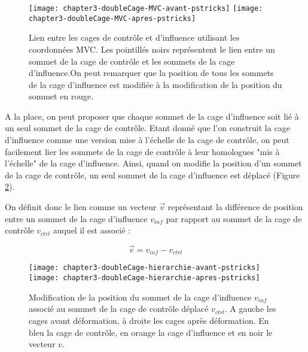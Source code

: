 \begin{figure}[ht]
\begin{center}
  \texttt{[image: chapter3-doubleCage-MVC-avant-pstricks]}
  \texttt{[image: chapter3-doubleCage-MVC-apres-pstricks]}

  \caption[Lien double-cage MVC] {Lien entre les cages de contrôle et
d'influence utilisant les coordonnées MVC. Les pointillés noirs représentent
le lien entre un sommet de la cage de contrôle et les sommets de la cage
d'influence.On peut remarquer que la position de tous les sommets de la cage
d'influence est modifiée à la modification de la position du sommet en rouge.}

  \label{MELDMV}
\end{center}
\end{figure}

A la place, on peut proposer que chaque sommet de la cage d'influence soit lié à
un seul sommet de la cage de contrôle. Etant donné que l'on construit la cage
d'influence comme une version mise à l'échelle de la cage de contrôle, on peut
facilement lier les sommets de la cage de contrôle à leur homologues "mis à
l'échelle" de la cage d'influence. Ainsi, quand on modifie la position d'un
sommet de la cage de contrôle, un seul sommet de la cage d'influence est
déplacé (Figure \ref{MELHie}).

On définit donc le lien comme un vecteur $\overrightarrow{v}$ représentant la
différence de position entre un sommet de la cage d'influence $v_{inf}$ par
rapport au sommet de la cage de contrôle $v_{ctrl}$ auquel il est associé :

\begin{displaymath}
  \overrightarrow{v} = v_{inf}-v_{ctrl}
\end{displaymath}

\begin{figure}[ht]
\begin{center}
  \texttt{[image: chapter3-doubleCage-hierarchie-avant-pstricks]}
  \texttt{[image: chapter3-doubleCage-hierarchie-apres-pstricks]}

  \caption[Association des cages de contrôle et d'influence] {Modification de
la position du sommet de la cage d'influence $v_{inf}$ associé au sommet de la
cage de contrôle déplacé $v_{ctrl}$. A gauche les cages avant déformation, à
droite les cages après déformation. En bleu la cage de contrôle, en orange la
cage d'influence et en noir le vecteur $v$.}

  \label{MELHie}
\end{center}
\end{figure}

